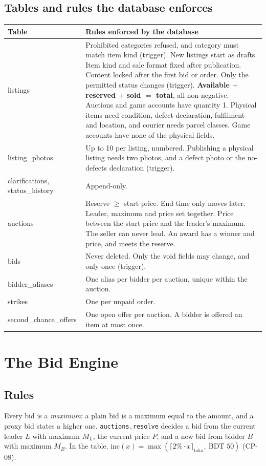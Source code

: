 \documentclass[11pt,a4paper]{article}
\newenvironment{dtable}[1]{\small\begin{longtable}{#1}}{\end{longtable}}
\begin{document}
\subsection{Tables and rules the database enforces}
\begin{dtable}{@{}>{\ttfamily\raggedright\arraybackslash}p{3.3cm}>{\raggedright\arraybackslash}p{11.9cm}@{}}
\toprule
\textnormal{\textbf{Table}} & \textbf{Rules enforced by the database} \\ \midrule \endhead
listings & Prohibited categories refused, and category must match item kind (trigger). New listings start as drafts. Item kind and sale format fixed after publication. Content locked after the first bid or order. Only the permitted status changes (trigger). \textbf{Available $+$ reserved $+$ sold $=$ total}, all non-negative. Auctions and game accounts have quantity 1. Physical items need condition, defect declaration, fulfilment and location, and courier needs parcel classes. Game accounts have none of the physical fields. \\
listing\_photos & Up to 10 per listing, numbered. Publishing a physical listing needs two photos, and a defect photo or the no-defects declaration (trigger). \\
clarifications, status\_history & Append-only. \\
auctions & Reserve $\ge$ start price. End time only moves later. Leader, maximum and price set together. Price between the start price and the leader's maximum. The seller can never lead. An award has a winner and price, and meets the reserve. \\
bids & Never deleted. Only the void fields may change, and only once (trigger). \\
bidder\_aliases & One alias per bidder per auction, unique within the auction. \\
strikes & One per unpaid order. \\
second\_chance\_offers & One open offer per auction. A bidder is offered an item at most once. \\
\bottomrule
\end{dtable}

\section{The Bid Engine}
\label{sec:engine}

\subsection{Rules}
\label{sec:rules}
Every bid is a \emph{maximum}: a plain bid is a maximum equal to the amount, and a proxy bid states a higher one. \texttt{auctions.resolve} decides a bid from the current leader $L$ with maximum $M_L$, the current price $P$, and a new bid from bidder $B$ with maximum $M_B$. In the table, $\mathrm{inc}(x) = \max(\lceil 2\%\cdot x\rceil_{\text{taka}},\ \text{BDT } 50)$ (CP-08).
\end{document}
